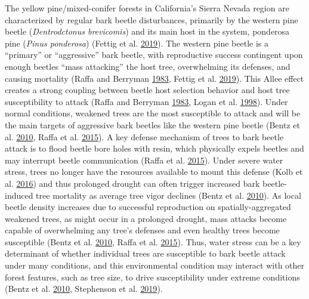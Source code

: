 \documentclass[twoside,12pt,final]{ucthesis-CA2012}
\begin{document}
\begin{ucmainmatter}
The yellow pine/mixed-conifer forests in California's Sierra Nevada
region are characterized by regular bark beetle disturbances, primarily
by the western pine beetle (\emph{Dentrodctonus brevicomis}) and its
main host in the system, ponderosa pine (\emph{Pinus ponderosa}) (Fettig
et al. \protect\hyperlink{ref-fettig2019}{2019}). The western pine
beetle is a ``primary'' or ``aggressive'' bark beetle, with reproductive
success contingent upon enough beetles ``mass attacking'' the host tree,
overwhelming its defenses, and causing mortality (Raffa and Berryman
\protect\hyperlink{ref-raffa1983}{1983}, Fettig et al.
\protect\hyperlink{ref-fettig2019}{2019}). This Allee effect creates a
strong coupling between beetle host selection behavior and host tree
susceptibility to attack (Raffa and Berryman
\protect\hyperlink{ref-raffa1983}{1983}, Logan et al.
\protect\hyperlink{ref-logan1998}{1998}). Under normal conditions,
weakened trees are the most susceptible to attack and will be the main
targets of aggressive bark beetles like the western pine beetle (Bentz
et al. \protect\hyperlink{ref-bentz2010}{2010}, Raffa et al.
\protect\hyperlink{ref-raffa2015}{2015}). A key defense mechanism of
trees to bark beetle attack is to flood beetle bore holes with resin,
which physically expels beetles and may interrupt beetle communication
(Raffa et al. \protect\hyperlink{ref-raffa2015}{2015}). Under severe
water stress, trees no longer have the resources available to mount this
defense (Kolb et al. \protect\hyperlink{ref-kolb2016}{2016}) and thus
prolonged drought can often trigger increased bark beetle-induced tree
mortality as average tree vigor declines (Bentz et al.
\protect\hyperlink{ref-bentz2010}{2010}). As local beetle density
increases due to successful reproduction on spatially-aggregated
weakened trees, as might occur in a prolonged drought, mass attacks
become capable of overwhelming any tree's defenses and even healthy
trees become susceptible (Bentz et al.
\protect\hyperlink{ref-bentz2010}{2010}, Raffa et al.
\protect\hyperlink{ref-raffa2015}{2015}). Thus, water stress can be a
key determinant of whether individual trees are susceptible to bark
beetle attack under many conditions, and this environmental condition
may interact with other forest features, such as tree size, to drive
susceptibility under extreme conditions (Bentz et al.
\protect\hyperlink{ref-bentz2010}{2010}, Stephenson et al.
\protect\hyperlink{ref-stephenson2019}{2019}).


\end{ucmainmatter}
\end{document}
